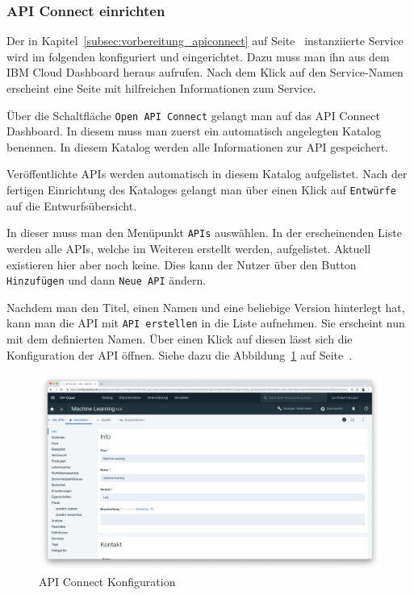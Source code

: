 \subsubsection{API Connect einrichten}
Der in Kapitel~\ref{subsec:vorbereitung_apiconnect} auf Seite~\pageref{subsec:vorbereitung_apiconnect} instanziierte
Service wird im folgenden konfiguriert und eingerichtet. Dazu muss man ihn aus dem IBM Cloud Dashboard heraus aufrufen.
Nach dem Klick auf den Service-Namen erscheint eine Seite mit hilfreichen Informationen zum Service.

Über die Schaltfläche \texttt{Open API Connect} gelangt man auf das API Connect Dashboard. In diesem muss man zuerst ein
automatisch angelegten Katalog benennen. In diesem Katalog werden alle Informationen zur API gespeichert.

Veröffentlichte APIs werden automatisch in diesem Katalog aufgelistet. Nach der fertigen Einrichtung des Kataloges
gelangt man über einen Klick auf \texttt{Entwürfe} auf die Entwurfsübersicht.

In dieser muss man den Menüpunkt \texttt{APIs} auswählen. In der erscheinenden Liste werden alle APIs, welche im
Weiteren erstellt werden, aufgelistet. Aktuell existieren hier aber noch keine. Dies kann der Nutzer über den Button
\texttt{Hinzufügen} und dann \texttt{Neue API} ändern.

Nachdem man den Titel, einen Namen und eine beliebige Version hinterlegt hat, kann man die API mit
\texttt{API erstellen} in die Liste aufnehmen. Sie erscheint nun mit dem definierten Namen. Über einen Klick auf diesen
lässt sich die Konfiguration der API öffnen. Siehe dazu die Abbildung~\ref{fig:umsetzung_apiconnect_config} auf
Seite~\pageref{fig:umsetzung_apiconnect_config}.

\begin{figure}[h]
    \centering
    \includegraphics[width=\textwidth]{images/kapitel_3/apiconnect_config.png}
    \caption{API Connect Konfiguration}
    \label{fig:umsetzung_apiconnect_config}
\end{figure}

